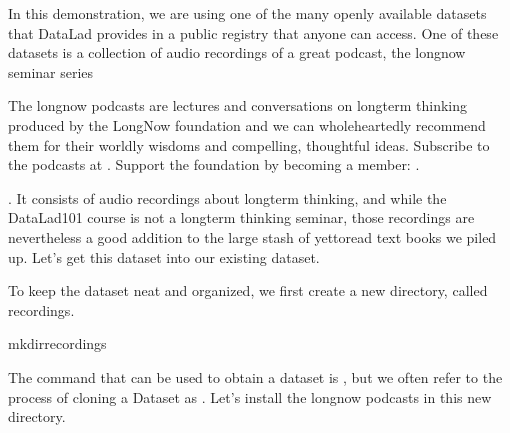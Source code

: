 \enlargethispage{0.5\baselineskip}
\sphinxAtStartPar
In this demonstration, we are using one of the many openly available datasets that
DataLad provides in a public registry that anyone can access. One of these datasets is a
collection of audio recordings of a great podcast, the longnow seminar series%
\begin{footnote}\sphinxAtStartFootnote
The longnow podcasts are lectures and conversations on long\sphinxhyphen{}term thinking produced by
the LongNow foundation and we can wholeheartedly recommend them for their worldly
wisdoms and compelling, thoughtful ideas. Subscribe to the podcasts at .
Support the foundation by becoming a member: .
%
\end{footnote}.
It consists of audio recordings about long\sphinxhyphen{}term thinking, and while the DataLad\sphinxhyphen{}101
course is not a long\sphinxhyphen{}term thinking seminar, those recordings are nevertheless a
good addition to the large stash of yet\sphinxhyphen{}to\sphinxhyphen{}read text books we piled up.
Let’s get this dataset into our existing  dataset.

\sphinxAtStartPar
To keep the  dataset neat and organized, we first create a new directory,
called recordings.

\begin{sphinxVerbatim}[commandchars=\\\{\}]
mkdirrecordings
\end{sphinxVerbatim}

\sphinxAtStartPar
The command that can be used to obtain a dataset is ,
but we often refer to the process of cloning a Dataset as .
Let’s install the longnow podcasts in this new directory.

